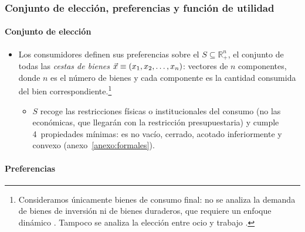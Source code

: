 \documentclass[11pt]{article}
\begin{document}
\subsubsection{Conjunto de elección, preferencias y función de utilidad}\label{sec:conjunto-eleccion-preferencias}

\paragraph{Conjunto de elección}

\begin{itemize}
\item Los consumidores definen sus preferencias sobre el  $S\subseteq\mathbb{R}^n_+$, el conjunto de todas las \emph{cestas de bienes} $\vec{x}\equiv(x_1,x_2,\dots,x_n)$: vectores de $n$ componentes, donde $n$ es el número de bienes y cada componente es la cantidad consumida del bien correspondiente.\footnote{Consideramos únicamente bienes de consumo final: no se analiza la demanda de bienes de inversión ni de bienes duraderos, que requiere un enfoque dinámico . Tampoco se analiza la elección entre ocio y trabajo .}
  \begin{itemize}
  \item $S$ recoge las restricciones físicas o institucionales del consumo (no las económicas, que llegarán con la restricción presupuestaria) y cumple 4~propiedades mínimas: es no vacío, cerrado, acotado inferiormente y convexo (anexo~\ref{anexo:formales}).
  \end{itemize}
\end{itemize}

\paragraph{Preferencias}
\end{document}
